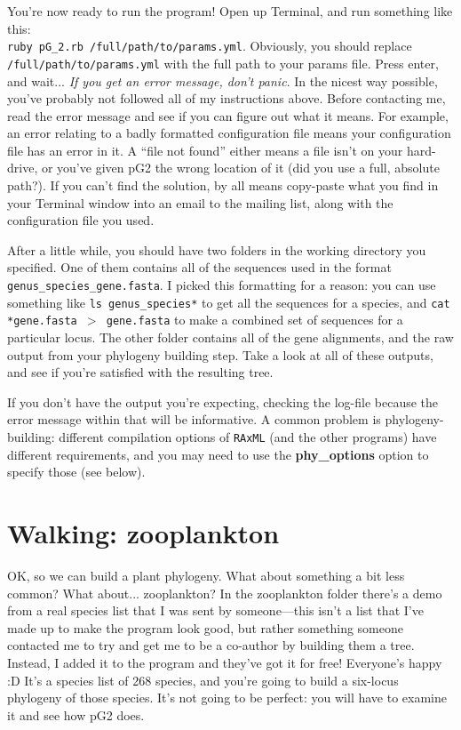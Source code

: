\documentclass[12pt]{article}
\begin{document}
You're now ready to run the program! Open up Terminal, and run
something like this: \\\texttt{ruby pG\_2.rb
  /full/path/to/params.yml}. Obviously, you should replace
\texttt{/full/path/to/params.yml} with the full path to your params
file. Press enter, and wait... \emph{If you get an error message,
  don't panic}. In the nicest way possible, you've probably not
followed all of my instructions above. Before contacting me, read the
error message and see if you can figure out what it means. For
example, an error relating to a badly formatted configuration file
means your configuration file has an error in it. A ``file not found''
either means a file isn't on your hard-drive, or you've given pG2 the
wrong location of it (did you use a full, absolute path?). If you
can't find the solution, by all means copy-paste what you find in your
Terminal window into an email to the mailing list, along with the
configuration file you used.

After a little while, you should have two folders in the working
directory you specified. One of them contains all of the sequences
used in the format \texttt{genus\_species\_gene.fasta}. I picked this
formatting for a reason: you can use something like \texttt{ls
  genus\_species*} to get all the sequences for a species, and
\texttt{cat *gene.fasta $>$ gene.fasta} to make a combined set of
sequences for a particular locus. The other folder contains all of the
gene alignments, and the raw output from your phylogeny building
step. Take a look at all of these outputs, and see if you're satisfied
with the resulting tree.

If you don't have the output you're expecting, checking the log-file
because the error message within that will be informative. A common
problem is phylogeny-building: different compilation options of
\texttt{RAxML} (and the other programs) have different requirements,
and you may need to use the \textbf{phy\_options} option to specify
those (see below).

\section*{Walking: zooplankton}
OK, so we can build a plant phylogeny. What about something a bit less
common? What about... zooplankton? In the zooplankton folder there's a
demo from a real species list that I was sent by someone---this isn't
a list that I've made up to make the program look good, but rather
something someone contacted me to try and get me to be a co-author by
building them a tree. Instead, I added it to the program and they've
got it for free! Everyone's happy :D It's a species list of 268
species, and you're going to build a six-locus phylogeny of those
species. It's not going to be perfect: you will have to examine it and
see how pG2 does.
\end{document}
